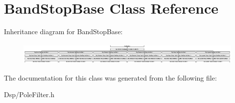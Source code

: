 \hypertarget{classBandStopBase}{\section{Band\-Stop\-Base Class Reference}
\label{classBandStopBase}
}
Inheritance diagram for Band\-Stop\-Base\-:\begin{figure}[H]
\begin{center}
\leavevmode
\includegraphics[height=1.131313cm]{classBandStopBase}
\end{center}
\end{figure}


The documentation for this class was generated from the following file\-:\begin{DoxyCompactItemize}
\item 
Dsp/Pole\-Filter.\-h\end{DoxyCompactItemize}
